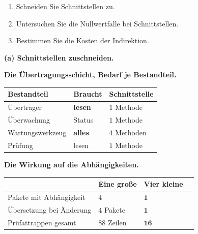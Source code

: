 \begin{aufgabe}
\begin{enumerate}[label=(\alph*)]
\item Schneiden Sie Schnittstellen zu.
\item Untersuchen Sie die Nullwertfalle bei Schnittstellen.
\item Bestimmen Sie die Kosten der Indirektion.
\end{enumerate}

\loesung
\textbf{(a) Schnittstellen zuschneiden.}

\textbf{Die Übertragungsschicht, Bedarf je Bestandteil.}

\begin{center}
{\small
\renewcommand{\arraystretch}{1.45}
\begin{tabular}{@{}P{2.8cm}P{2.6cm}P{2.6cm}@{}}
\toprule
\textbf{Bestandteil} & \textbf{Braucht} & \textbf{Schnittstelle}\\
\midrule
Übertrager & \textbf{lesen} & $1$ Methode\\
Überwachung & Status & $1$ Methode\\
Wartungs\-werkzeug & \textbf{alles} & $4$ Methoden\\
Prüfung & lesen & \textcolor{gruen}{$1$ Methode}\\
\bottomrule
\end{tabular}}
\end{center}

\begin{center}
\begin{minipage}{0.88\textwidth}
\end{minipage}
\end{center}

\textbf{Die Wirkung auf die Abhängigkeiten.}

\begin{center}
\renewcommand{\arraystretch}{1.45}
\begin{tabular}{@{}P{2.8cm}P{2.2cm}P{2.4cm}P{1.8cm}@{}}
\toprule
& \textbf{Eine große} & \textbf{Vier kleine} & \\
\midrule
Pakete mit Abhängigkeit & $4$ & $\mathbf{1}$ & \\
Übersetzung bei Änderung & \textcolor{akzent}{$4$ Pakete} & \textcolor{gruen}{$\mathbf{1}$} & \\
Prüfattrappen gesamt & $88$ Zeilen & $\mathbf{16}$ & \\
\bottomrule
\end{tabular}
\end{center}


\end{aufgabe}
